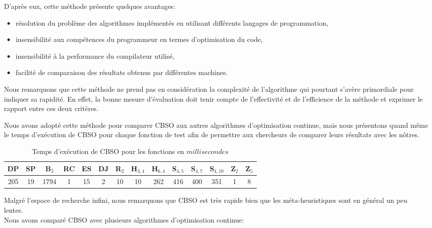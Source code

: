 \bigskip

D'après eux, cette méthode présente quelques avantages:

\bigskip

\begin{itemize}
	\item résolution du problème des algorithmes implémentés en utilisant
	différents langages de programmation,
	\item insensibilité aux compétences du programmeur en termes
	d'optimisation du code,
	\item insensibilité à la performance du compilateur utilisé,
	\item facilité de comparaison des résultats obtenus par
	différentes machines.
\end{itemize}

Nous remarquons que cette méthode ne prend pas en considération la complexité de l'algorithme qui pourtant s'avère primordiale pour indiquer sa rapidité. En effet, la bonne mesure d'évaluation doit tenir compte de l'effectivité et de l'efficience de la méthode et exprimer le rapport entre ces deux critères.

Nous avons adopté cette méthode pour comparer CBSO aux autres algorithmes d'optimisation continue, mais nous présentons quand même le temps d'exécution de CBSO pour chaque fonction de test afin de permettre aux chercheurs de comparer leurs résultats avec les nôtres.\\

\begin{table}[H]\centering
	\begin{tabular}{cccccccccccccc}
		\toprule \textbf{DP} & \textbf{SP} & \textbf{B$_2$} & \textbf{RC} & \textbf{ES} & \textbf{DJ} & \textbf{R$_2$} & \textbf{H$_{3,4}$} & \textbf{H$_{6,4}$} & \textbf{S$_{4,5}$} & \textbf{S$_{4,7}$} & \textbf{S$_{4,10}$} & \textbf{Z$_2$} & \textbf{Z$_5$} \\    \midrule
		205 & 19 & 1794 & 1 & 15 & 2 & 10 & 10 & 262 & 416 & 400 & 351 & 1  & 8 \\
		\bottomrule	
	\end{tabular}
	\caption{Temps d'exécution de CBSO pour les fonctions en $millisecondes$\label{exe_table}}
\end{table}

Malgré l'espace de recherche infini, nous remarquons que CBSO est très rapide bien que les méta-heuristiques sont en général un peu lentes.\\

Nous avons comparé CBSO avec plusieurs algorithmes d'optimisation continue:

